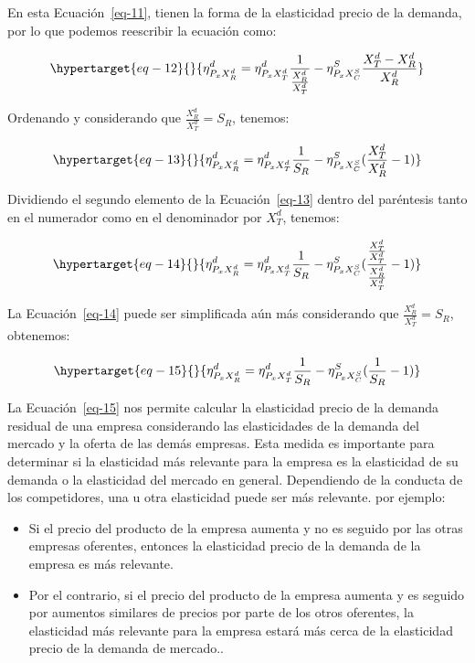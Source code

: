 \documentclass[
  a4paper,
]{article}
\providecommand{\tightlist}{%
  \setlength{\itemsep}{0pt}\setlength{\parskip}{0pt}}\usepackage{longtable,booktabs,array}
\begin{document}
En esta Ecuación~\ref{eq-11}, tienen la forma de la elasticidad precio
de la demanda, por lo que podemos reescribir la ecuación como:

\begin{equation}\protect\hypertarget{eq-12}{}{
\eta_{P_{x}X_R^d}^d = \eta_{P_{x}X_T^d}^d \frac{1}{\frac{X_R^d}{X_T^d}} - \eta_{P_{x}X_C^S}^S \frac{X_T^d - X_R^d}{X_R^d}
}\label{eq-12}\end{equation}

Ordenando y considerando que \(\frac{X_R^d}{X_T^d} = S_R\), tenemos:

\begin{equation}\protect\hypertarget{eq-13}{}{
\eta_{P_{x}X_R^d}^d = \eta_{P_{x}X_T^d}^d \frac{1}{S_R} - \eta_{P_{x}X_C^S}^S (\frac{X_T^d}{X_R^d} - 1)
}\label{eq-13}\end{equation}

Dividiendo el segundo elemento de la Ecuación~\ref{eq-13} dentro del
paréntesis tanto en el numerador como en el denominador por \(X_T^d\),
tenemos:

\begin{equation}\protect\hypertarget{eq-14}{}{
\eta_{P_{x}X_R^d}^d = \eta_{P_{x}X_T^d}^d \frac{1}{S_R} - \eta_{P_{x}X_C^S}^S (\frac{\frac{X_T^d}{X_T^d}}{\frac{X_R^d}{X_T^d}} - 1)
}\label{eq-14}\end{equation}

La Ecuación~\ref{eq-14} puede ser simplificada aún más considerando que
\(\frac{X_R^d}{X_T^d} = S_R\), obtenemos:

\begin{equation}\protect\hypertarget{eq-15}{}{
\eta_{P_{x}X_R^d}^d = \eta_{P_{x}X_T^d}^d \frac{1}{S_R} - \eta_{P_{x}X_C^S}^S (\frac{1}{S_R} - 1)
}\label{eq-15}\end{equation}

La Ecuación~\ref{eq-15} nos permite calcular la elasticidad precio de la
demanda residual de una empresa considerando las elasticidades de la
demanda del mercado y la oferta de las demás empresas. Esta medida es
importante para determinar si la elasticidad más relevante para la
empresa es la elasticidad de su demanda o la elasticidad del mercado en
general. Dependiendo de la conducta de los competidores, una u otra
elasticidad puede ser más relevante. por ejemplo:

\begin{itemize}
\tightlist
\item
  Si el precio del producto de la empresa aumenta y no es seguido por
  las otras empresas oferentes, entonces la elasticidad precio de la
  demanda de la empresa es más relevante.
\item
  Por el contrario, si el precio del producto de la empresa aumenta y es
  seguido por aumentos similares de precios por parte de los otros
  oferentes, la elasticidad más relevante para la empresa estará más
  cerca de la elasticidad precio de la demanda de mercado..
\end{itemize}
\end{document}

